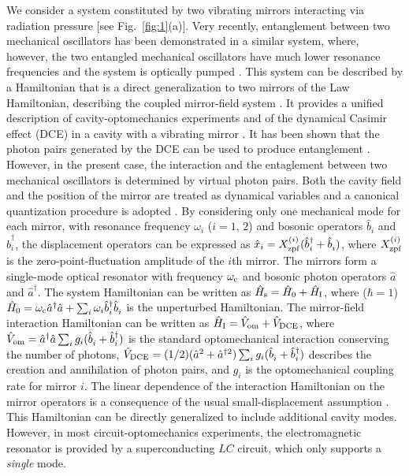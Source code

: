 \documentclass[aps,pra,twocolumn,floatfix,longbibliography, superscriptaddress]{revtex4-1}
\begin{document}
	We consider a system constituted by two vibrating mirrors interacting via radiation pressure [see Fig.~\ref{fig:1}(a)]. 
	Very recently, entanglement between two mechanical oscillators has been demonstrated in a similar system, where, however, the two entangled  mechanical oscillators have much lower resonance frequencies and the system is optically pumped \cite{Ockeloen2017}.
	This system can be described by a Hamiltonian that is a direct generalization to two mirrors of the Law Hamiltonian, describing the coupled mirror-field system \cite{Law1995,Butera2013,Macri2017,Sala2017,Armata2017}.
	It provides a unified description of cavity-optomechanics experiments \cite{Aspelmeyer2014} and of the dynamical Casimir effect (DCE) \cite{moore1970,Nation2012,Johansson2009,Johansson2010,Wilson2011} in a cavity with a vibrating mirror \cite{Macri2017}. It has been shown \cite{Johansson2009,Johansson2010,Wilson2011,Johansson2013,felicetti2014,stassi2015,rossatto2016} that the photon pairs generated by the DCE can be used to produce entanglement . However, in the present case, the interaction and the entaglement between two mechanical oscillators is determined by virtual photon pairs.
		Both the cavity field and the position of the mirror are treated as dynamical
	variables and a canonical quantization procedure is adopted \cite{Law1995}.  
	By considering only one mechanical mode for each mirror, with resonance frequency $\omega_{ i}$ ($i = 1,\, 2$)  and bosonic operators $\hat b^{}_i$ and $\hat b_i^\dag$, the displacement operators can be expressed as $\hat x_i = X^{(i)}_{\rm zpf} (\hat b_i^\dag + \hat b^{}_i)$, where 
	$X^{(i)}_{\rm zpf}$ is the zero-point-fluctuation amplitude of the $i$th mirror.
	The mirrors form a single-mode optical resonator with frequency $\omega_{\rm c}$ and bosonic photon operators $\hat a$ and $\hat a^\dag$. The system Hamiltonian can be written as 
	$\hat H_{\rm s} = \hat H_0 + \hat H_{\rm I}$, 
	where ($\hbar =1$) $
	\hat H_0 =  \omega_{\rm c} \hat a^\dag \hat a + \sum_i \omega_{i} \hat b_i^\dag \hat b^{}_i$
	is the unperturbed Hamiltonian. The mirror-field interaction Hamiltonian can be written as 
	$\hat H_{\rm I} = \hat V_{\rm om} + \hat V_{\rm DCE}$, where $\hat V_{\rm om} = \hat a^\dag \hat a \sum_i g_i (\hat b^{}_i + \hat b_i^\dag)$ is the standard optomechanical interaction conserving the number of photons, $\hat V_{\rm DCE} = (1/2) (\hat a^2 + \hat a^{\dag 2} ) \sum_i g_i (\hat b^{}_i + \hat b_i^\dag)$ describes the creation and annihilation of photon pairs, and $g_i$ is the optomechanical coupling rate for mirror $i$. The linear dependence of the interaction Hamiltonian on the mirror operators is a consequence of the usual small-displacement assumption \cite{Law1995}. This Hamiltonian can be directly generalized to include additional cavity modes. However, in most circuit-optomechanics experiments, the electromagnetic resonator is provided by a superconducting $LC$ circuit, which only supports a {\em single} mode.
	
\end{document}
